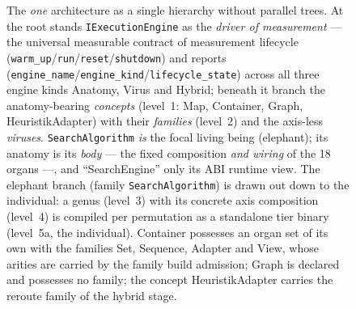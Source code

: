 \begin{figure}[!htbp]
  \caption{The \emph{one} architecture as a single hierarchy without parallel trees. At the root stands
  \texttt{IExecutionEngine} as the \emph{driver of measurement} --- the universal measurable contract of
  measurement lifecycle (\texttt{warm\_up}/\texttt{run}/\texttt{reset}/\texttt{shutdown}) and reports
  (\texttt{engine\_name}/\texttt{engine\_kind}/\texttt{lifecycle\_state}) across all three engine kinds
  Anatomy, Virus and Hybrid; beneath it branch the anatomy-bearing \emph{concepts} (level~1: Map,
  Container, Graph, HeuristikAdapter) with their \emph{families} (level~2) and the axis-less
  \emph{viruses}. \texttt{SearchAlgorithm} \emph{is} the focal living being (elephant); its anatomy is its
  \emph{body} --- the fixed composition \emph{and wiring} of the 18 organs ---, and
  \enquote{SearchEngine} only its ABI runtime view. The elephant branch (family \texttt{SearchAlgorithm}) is drawn out down to the
  individual: a genus (level~3) with its concrete axis composition (level~4) is compiled per permutation
  as a standalone tier binary (level~5a, the individual). Container possesses an organ set of its own with the families Set, Sequence, Adapter
  and View, whose arities are carried by the family build admission; Graph is declared and possesses no
  family; the concept HeuristikAdapter carries the reroute family of the hybrid stage.}\label{fig:one-architecture}
\end{figure}

